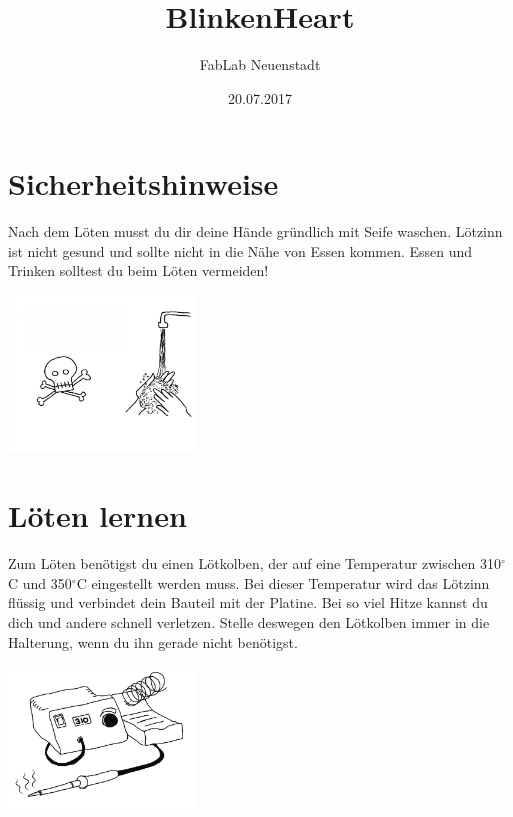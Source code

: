\documentclass{book} %
\title{BlinkenHeart}
\author{FabLab Neuenstadt}
\date{20.07.2017}
\begin{document}
\maketitle

\newpage
\section{Sicherheitshinweise}
Nach dem Löten musst du dir deine Hände gründlich mit Seife
waschen. Lötzinn ist nicht gesund und sollte nicht in die Nähe von
Essen kommen. Essen und Trinken solltest du beim Löten vermeiden!
\begin{center}
\includegraphics[width=5cm]{-000}
\end{center}

\newpage
\section{Löten lernen}
Zum Löten benötigst du einen Lötkolben, der auf eine Temperatur
zwischen 310$^\circ$C und 350$^\circ$C eingestellt werden muss. Bei dieser
Temperatur wird das Lötzinn flüssig und verbindet dein Bauteil mit der
Platine. Bei so viel Hitze kannst du dich und andere schnell verletzen.
Stelle deswegen den Lötkolben immer in die Halterung, wenn du ihn
gerade nicht benötigst.
\begin{center}
	\includegraphics[width=5cm]{-002}
\end{center}
\end{document}
